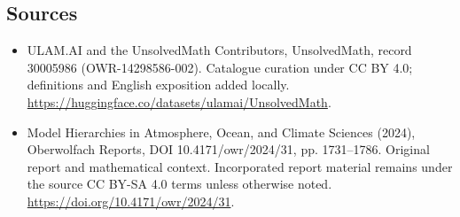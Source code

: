 \documentclass[11pt]{article}
\begin{document}
\subsection{Sources}
\begin{itemize}
\item[\hypertarget{source:30005986:1}{S1}] ULAM.AI and the UnsolvedMath Contributors, UnsolvedMath, record 30005986 (OWR-14298586-002). Catalogue curation under CC BY 4.0; definitions and English exposition added locally.
\url{https://huggingface.co/datasets/ulamai/UnsolvedMath}.
\item[\hypertarget{source:30005986:2}{S2}] Model Hierarchies in Atmosphere, Ocean, and Climate Sciences (2024), Oberwolfach Reports, DOI 10.4171/owr/2024/31, pp. 1731--1786. Original report and mathematical context. Incorporated report material remains under the source CC BY-SA 4.0 terms unless otherwise noted.
\url{https://doi.org/10.4171/owr/2024/31}.
\end{itemize}
\label{end:30005986}
\end{document}

